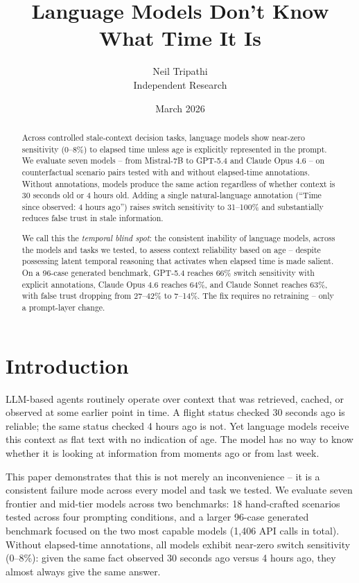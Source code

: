 \documentclass[11pt,a4paper]{article}
\title{Language Models Don't Know What Time It Is}
\author{
  Neil Tripathi \\
  Independent Research
}
\date{March 2026}
\begin{document}
\maketitle

\begin{abstract}
Across controlled stale-context decision tasks, language models show near-zero sensitivity (0--8\%) to elapsed time unless age is explicitly represented in the prompt.
We evaluate seven models -- from Mistral-7B to GPT-5.4 and Claude Opus 4.6 -- on counterfactual scenario pairs tested with and without elapsed-time annotations.
Without annotations, models produce the same action regardless of whether context is 30 seconds old or 4 hours old.
Adding a single natural-language annotation (``Time since observed: 4 hours ago'') raises switch sensitivity to 31--100\% and substantially reduces false trust in stale information.

We call this the \emph{temporal blind spot}: the consistent inability of language models, across the models and tasks we tested, to assess context reliability based on age -- despite possessing latent temporal reasoning that activates when elapsed time is made salient.
On a 96-case generated benchmark, GPT-5.4 reaches 66\% switch sensitivity with explicit annotations, Claude Opus 4.6 reaches 64\%, and Claude Sonnet reaches 63\%, with false trust dropping from 27--42\% to 7--14\%.
The fix requires no retraining -- only a prompt-layer change.
\end{abstract}

\section{Introduction}
\label{sec:intro}

LLM-based agents routinely operate over context that was retrieved, cached, or observed at some earlier point in time.
A flight status checked 30 seconds ago is reliable; the same status checked 4 hours ago is not.
Yet language models receive this context as flat text with no indication of age.
The model has no way to know whether it is looking at information from moments ago or from last week.

This paper demonstrates that this is not merely an inconvenience -- it is a consistent failure mode across every model and task we tested.
We evaluate seven frontier and mid-tier models across two benchmarks: 18 hand-crafted scenarios tested across four prompting conditions, and a larger 96-case generated benchmark focused on the two most capable models (1{,}406 API calls in total).
Without elapsed-time annotations, all models exhibit near-zero switch sensitivity (0--8\%): given the same fact observed 30 seconds ago versus 4 hours ago, they almost always give the same answer.
\end{document}
